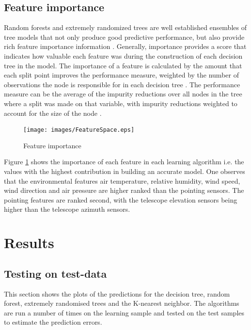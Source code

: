 \subsection{Feature importance}
Random forests and extremely randomized trees are well established ensembles of tree models that not only produce good predictive performance, but also provide rich feature importance information \citep{kazemitabar2017variable}. Generally, importance provides a score that indicates how  valuable each feature was during the construction of each decision tree in the model. The importance of a feature is calculated by the amount that each split point improves the performance measure, weighted by the number of observations the node is responsible for in each decision tree \citep{kazemitabar2017variable}. The performance measure can be the average of the impurity reductions over all nodes in the tree where a split was made on that variable, with impurity reductions weighted to account for the size of the node \citep{kazemitabar2017variable}.

\begin{figure}[H]
  \centering
    \texttt{[image: images/FeatureSpace.eps]}
    \caption{Feature importance}
    \label{FI}
\end{figure}
Figure \ref{FI} shows the importance of each feature in each learning algorithm i.e. the values with the highest contribution in building an accurate model. One observes that the environmental features air temperature, relative humidity, wind speed, wind direction and air pressure are higher ranked than the pointing sensors. The pointing features are ranked second, with the telescope elevation sensors being higher than the telescope azimuth sensors. 

\section{Results}

\subsection{Testing on test-data}
\label{sec3}
This section shows the plots of the predictions for the decision tree, random forest, extremely randomised trees and the K-nearest neighbor. The algorithms are run a number of times on the learning sample and tested on the test samples to estimate the prediction errors. 
